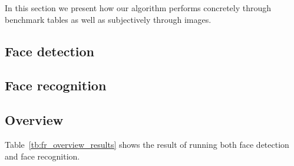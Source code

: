In this section we present how our algorithm performs concretely through benchmark tables as well as subjectively through images.

\subsection{Face detection}


\subsection{Face recognition}


\subsection{Overview}
Table~\ref{tb:fr_overview_results} shows the result of running both face detection and face recognition.

\begin{center}
  \label{tb:fr_overview_results}
\end{center}
